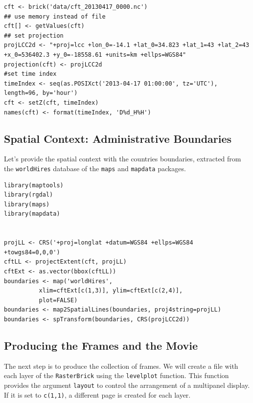 \lstset{language=R,numbers=none}
\begin{lstlisting}
cft <- brick('data/cft_20130417_0000.nc')
## use memory instead of file
cft[] <- getValues(cft)
## set projection
projLCC2d <- "+proj=lcc +lon_0=-14.1 +lat_0=34.823 +lat_1=43 +lat_2=43 +x_0=536402.3 +y_0=-18558.61 +units=km +ellps=WGS84"
projection(cft) <- projLCC2d
#set time index
timeIndex <- seq(as.POSIXct('2013-04-17 01:00:00', tz='UTC'), length=96, by='hour')
cft <- setZ(cft, timeIndex)
names(cft) <- format(timeIndex, 'D%d_H%H')
\end{lstlisting}

\subsection{Spatial Context: Administrative Boundaries}
\label{sec-5-2}
Let's provide the spatial context with the countries
boundaries, extracted from the \texttt{worldHires} database of the \texttt{maps}
and \texttt{mapdata} packages.


\lstset{language=R,numbers=none}
\begin{lstlisting}
library(maptools)
library(rgdal)
library(maps)
library(mapdata)


projLL <- CRS('+proj=longlat +datum=WGS84 +ellps=WGS84 +towgs84=0,0,0')
cftLL <- projectExtent(cft, projLL)
cftExt <- as.vector(bbox(cftLL))
boundaries <- map('worldHires',
		  xlim=cftExt[c(1,3)], ylim=cftExt[c(2,4)],
		  plot=FALSE)
boundaries <- map2SpatialLines(boundaries, proj4string=projLL)
boundaries <- spTransform(boundaries, CRS(projLCC2d))
\end{lstlisting}

\subsection{Producing the Frames and the Movie}
\label{sec-5-3}
The next step is to produce the collection of frames. We will create a
file with each layer of the \texttt{RasterBrick} using the \texttt{levelplot}
function. This function provides the argument \texttt{layout} to control the
arrangement of a multipanel display. If it is set to \texttt{c(1,1)}, a
different page is created for each layer.

